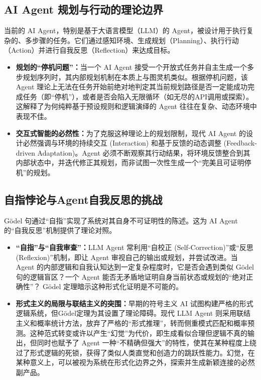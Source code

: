 \documentclass[a4paper,12pt]{ctexart}
\begin{document}
\subsection{AI Agent 规划与行动的理论边界}
当前的 AI Agent，特别是基于大语言模型（LLM）的 Agent，被设计用于执行复杂的、多步骤的任务。它们通过感知环境、生成规划（Planning）、执行行动（Action）并进行自我反思（Reflection）来达成目标。
\begin{itemize}[leftmargin=*,noitemsep,topsep=0pt]
    \item \textbf{规划的“停机问题”：}当一个 AI Agent 接受一个开放式任务并自主生成一个多步规划序列时，其内部规划机制在本质上与图灵机类似。根据停机问题，该 Agent 理论上无法在任务开始前绝对地判定其当前规划路径是否一定能成功完成任务（即“停机”），或者是否会陷入无限循环（如无尽的API调用或探索）。这解释了为何纯粹基于预设规则和逻辑演绎的 Agent 往往在复杂、动态环境中表现不佳。
    \item \textbf{交互式智能的必然性：}为了克服这种理论上的规划限制，现代 AI Agent 的设计必然强调与环境的持续交互 (Interaction) 和基于反馈的动态调整 (Feedback-driven Adaptation)。Agent 必须不断观察其行动结果，将环境反馈整合到其内部状态中，并迭代修正其规划，而非试图一次性生成一个“完美且可证明停机”的规划。
\end{itemize}

\subsection{自指悖论与Agent自我反思的挑战}
Gödel 句通过“自指”实现了系统对其自身不可证明性的陈述。这为 AI Agent 的“自我反思”机制提供了理论对照。
\begin{itemize}[leftmargin=*,noitemsep,topsep=0pt]
    \item \textbf{“自指”与“自我审查”：}LLM Agent 常利用“自校正 (Self-Correction)”或“反思 (Reflexion)”机制，即让 Agent 审视自己的输出或规划，并尝试改进。当 Agent 的内部逻辑和自我认知达到一定复杂程度时，它是否会遇到类似 Gödel 句的逻辑盲区？一个 Agent 能否无矛盾地证明自身当前状态或规划的“绝对正确性”？ Gödel 定理暗示这种形式化证明是不可能的。
    \item \textbf{形式主义的局限与联结主义的突围：}早期的符号主义 AI 试图构建严格的形式逻辑系统，但Gödel定理为其设置了理论障碍。现代 LLM Agent 则采用联结主义和概率统计方法，放弃了严格的“形式推理”，转而侧重模式匹配和概率预测。这种范式转变或许以产生“幻觉”为代价，即生成看似合理但逻辑不真的输出，但同时也赋予了 Agent 一种“不精确但强大”的特性，使其在某种程度上绕过了形式逻辑的死锁，获得了类似人类直觉和创造力的跳跃性能力。幻觉，在某种意义上，可以被视为系统在形式化边界之外，探索并生成新颖连接的必然副产品。
\end{itemize}
\end{document}
